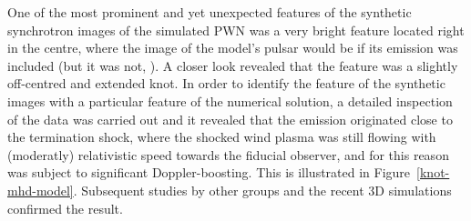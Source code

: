 One of the most prominent and yet unexpected features of the synthetic synchrotron images of the simulated PWN was 
a very bright feature located right in the centre, where the image of the model’s pulsar would be if its emission was included (but it was not, \cite{ssk-lyub-03,ssk-lyub-04}).  A closer look revealed that the feature was a slightly off-centred and extended knot.  In order to identify the feature of the synthetic images with a particular feature of the numerical solution,  a detailed inspection of the data was carried out and it revealed that the emission originated close to the termination shock, where the shocked wind plasma was still flowing with  (moderatly) relativistic speed towards the fiducial observer,  and for this reason was subject to significant 
Doppler-boosting.  This is illustrated in Figure~\ref{knot-mhd-model}. Subsequent  studies by other groups \cite{delzanna-06} and  the recent 3D simulations \citep{porth-13,porth-14} confirmed the result.       


